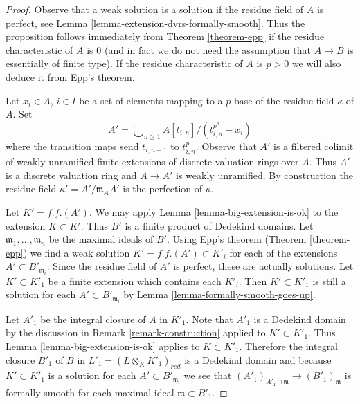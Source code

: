 \begin{proof}
Observe that a weak solution is a solution if the residue field of $A$
is perfect, see Lemma \ref{lemma-extension-dvrs-formally-smooth}.
Thus the proposition follows immediately from Theorem \ref{theorem-epp}
if the residue characteristic of $A$ is $0$ (and in fact we do not need
the assumption that $A \to B$ is essentially of finite type).
If the residue characteristic of $A$ is $p > 0$ we will also deduce it from
Epp's theorem.

\medskip\noindent
Let $x_i \in A$, $i \in I$ be a set of elements mapping to a $p$-base of
the residue field $\kappa$ of $A$. Set
$$
A' = \bigcup\nolimits_{n \geq 1} A[t_{i, n}]/(t_{i, n}^{p^n} - x_i)
$$
where the transition maps send $t_{i, n + 1}$ to $t_{i, n}^p$. Observe
that $A'$ is a filtered colimit of weakly unramified finite extensions
of discrete valuation rings over $A$. Thus $A'$ is a discrete valuation
ring and $A \to A'$ is weakly unramified. By construction the residue field
$\kappa' = A'/\mathfrak m_A A'$ is the perfection of $\kappa$.

\medskip\noindent
Let $K' = f.f.(A')$. We may apply Lemma \ref{lemma-big-extension-is-ok}
to the extension $K \subset K'$. Thus $B'$ is a finite product of
Dedekind domains. Let $\mathfrak m_1, \ldots, \mathfrak m_n$ be the
maximal ideals of $B'$. Using Epp's theorem (Theorem \ref{theorem-epp})
we find a weak solution $K' = f.f.(A') \subset K'_i$ for each of the
extensions $A' \subset B'_{\mathfrak m_i}$. Since the residue field
of $A'$ is perfect, these are actually solutions. Let $K' \subset K'_1$
be a finite extension which contains each $K'_i$. Then $K' \subset K'_1$
is still a solution for each $A' \subset B'_{\mathfrak m_i}$ by
Lemma \ref{lemma-formally-smooth-goes-up}.

\medskip\noindent
Let $A'_1$ be the integral closure of $A$ in $K'_1$. Note that
$A'_1$ is a Dedekind domain by the discussion in
Remark \ref{remark-construction} applied to $K' \subset K'_1$.
Thus Lemma \ref{lemma-big-extension-is-ok} applies to $K \subset K'_1$.
Therefore the integral closure $B'_1$ of $B$ in
$L'_1 = (L \otimes_K K'_1)_{red}$ is a Dedekind domain and because
$K' \subset K'_1$ is a solution for each $A' \subset B'_{\mathfrak m_i}$
we see that $(A'_1)_{A'_1 \cap \mathfrak m} \to (B'_1)_{\mathfrak m}$
is formally smooth for each maximal ideal $\mathfrak m \subset B'_1$.


\end{proof}
